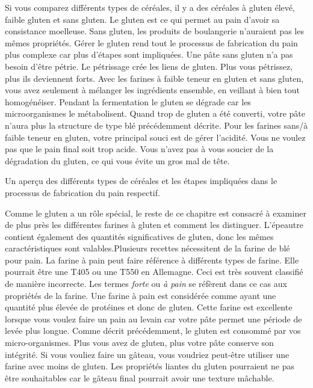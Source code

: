 Si vous comparez différents types de céréales, il y a des céréales à gluten élevé, faible gluten
et sans gluten. Le gluten est ce qui permet au pain d'avoir sa consistance moelleuse.
Sans gluten, les produits de boulangerie n'auraient pas les mêmes propriétés. Gérer
le gluten rend tout le processus de fabrication du pain plus complexe car plus d'étapes sont impliquées.
Une pâte sans gluten n'a pas besoin d'être pétrie. Le pétrissage crée
les liens de gluten. Plus vous pétrissez, plus ils deviennent forts. Avec les farines
à faible teneur en gluten et sans gluten, vous avez seulement à mélanger les ingrédients ensemble, en veillant à bien tout homogénéiser. Pendant la fermentation
le gluten se dégrade car les microorganismes le métabolisent. Quand trop de gluten
a été converti, votre pâte n'aura plus la structure de type blé précédemment
décrite. Pour les farines sans/à faible teneur en gluten, votre principal souci est de gérer l'acidité. Vous ne voulez pas
que le pain final soit trop acide. Vous n'avez pas à vous soucier de la dégradation du gluten,
ce qui vous évite un gros mal de tête.

\begin{table}[!htb]
    \begin{center}
        
        \caption[Différents types de céréales]{Un aperçu des différents types de céréales
          et les étapes impliquées dans le processus de fabrication du pain respectif.}
    \end{center}
\end{table}

Comme le gluten a un rôle spécial, le reste de ce chapitre est consacré à examiner de plus près les différentes farines à gluten et comment les distinguer. L'épeautre
contient également des quantités significatives de gluten, donc les mêmes caractéristiques sont valables.Plusieurs recettes nécessitent de la farine de blé pour pain. La farine à pain peut faire référence à différents types de farine. Elle pourrait être une T405 ou une T550 en Allemagne. Ceci est très souvent classifié de manière incorrecte. Les termes \emph{forte} ou \emph{à pain} se réfèrent dans ce cas aux propriétés de la farine. Une farine à pain est considérée comme ayant une quantité plus élevée de protéines et donc de gluten. Cette farine est excellente lorsque vous voulez faire un pain au levain car votre pâte permet une période de levée plus longue. Comme décrit précédemment, le gluten est consommé par vos micro-organismes. Plus vous avez de gluten, plus votre pâte conserve son intégrité. Si vous vouliez faire un gâteau, vous voudriez peut-être utiliser une farine avec moins de gluten. Les propriétés liantes du gluten pourraient ne pas être souhaitables car le gâteau final pourrait avoir une texture mâchable.

